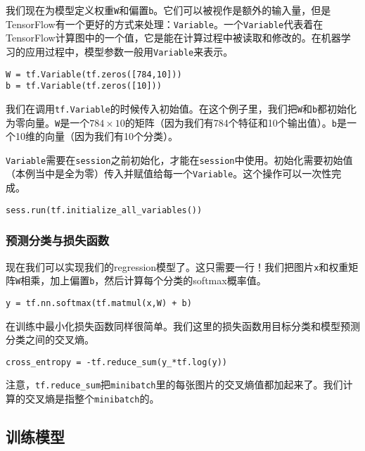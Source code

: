 我们现在为模型定义权重\lstinline{W}和偏置\lstinline{b}。它们可以被视作是额外的输入量，但是TensorFlow有一个更好的方式来处理：\lstinline{Variable}。一个\lstinline{Variable}代表着在TensorFlow计算图中的一个值，它是能在计算过程中被读取和修改的。在机器学习的应用过程中，模型参数一般用\lstinline{Variable}来表示。

\begin{lstlisting}
W = tf.Variable(tf.zeros([784,10]))
b = tf.Variable(tf.zeros([10]))
\end{lstlisting}

我们在调用\lstinline{tf.Variable}的时候传入初始值。在这个例子里，我们把\lstinline{W}和\lstinline{b}都初始化为零向量。\lstinline{W}是一个$784\times10$的矩阵（因为我们有784个特征和10个输出值）。\lstinline{b}是一个10维的向量（因为我们有10个分类）。

\lstinline{Variable}需要在\lstinline{session}之前初始化，才能在\lstinline{session}中使用。初始化需要初始值（本例当中是全为零）传入并赋值给每一个\lstinline{Variable}。这个操作可以一次性完成。

\begin{lstlisting}
sess.run(tf.initialize_all_variables())
\end{lstlisting}

\subsubsection{预测分类与损失函数}
现在我们可以实现我们的regression模型了。这只需要一行！我们把图片\lstinline{x}和权重矩阵\lstinline{W}相乘，加上偏置\lstinline{b}，然后计算每个分类的softmax概率值。

\begin{lstlisting}
y = tf.nn.softmax(tf.matmul(x,W) + b)
\end{lstlisting}

在训练中最小化损失函数同样很简单。我们这里的损失函数用目标分类和模型预测分类之间的交叉熵。

\begin{lstlisting}
cross_entropy = -tf.reduce_sum(y_*tf.log(y))
\end{lstlisting}

注意，\lstinline{tf.reduce_sum}把\lstinline{minibatch}里的每张图片的交叉熵值都加起来了。我们计算的交叉熵是指整个\lstinline{minibatch}的。

\subsection{训练模型}

